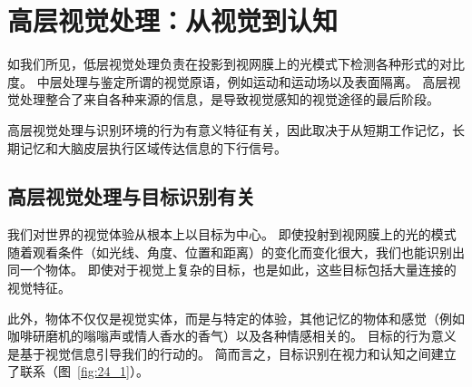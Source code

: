 \chapter{高层视觉处理：从视觉到认知} \label{chap:chap24}

如我们所见，低层视觉处理负责在投影到视网膜上的光模式下检测各种形式的对比度。
中层处理与鉴定所谓的视觉原语，例如运动和运动场以及表面隔离。
高层视觉处理整合了来自各种来源的信息，是导致视觉感知的视觉途径的最后阶段。


高层视觉处理与识别环境的行为有意义特征有关，因此取决于从短期工作记忆，长期记忆和大脑皮层执行区域传达信息的下行信号。


\section{高层视觉处理与目标识别有关}

我们对世界的视觉体验从根本上以目标为中心。
即使投射到视网膜上的光的模式随着观看条件（如光线、角度、位置和距离）的变化而变化很大，我们也能识别出同一个物体。
即使对于视觉上复杂的目标，也是如此，这些目标包括大量连接的视觉特征。


此外，物体不仅仅是视觉实体，而是与特定的体验，其他记忆的物体和感觉（例如咖啡研磨机的嗡嗡声或情人香水的香气）以及各种情感相关的。
目标的行为意义是基于视觉信息引导我们的行动的。
简而言之，目标识别在视力和认知之间建立了联系（图~\ref{fig:24_1}）。


